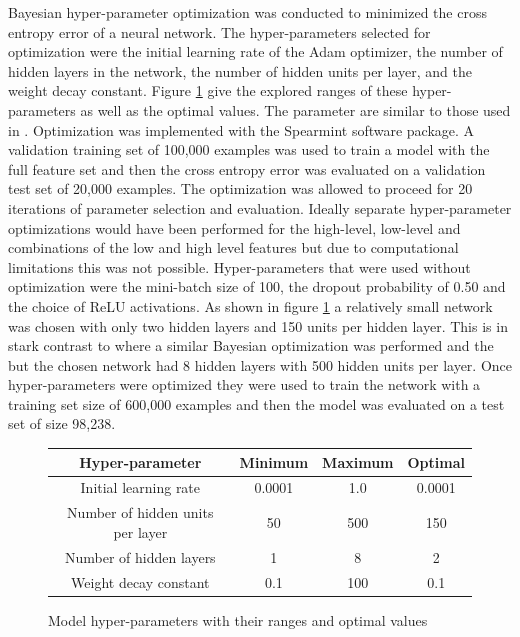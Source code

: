 \documentclass[12pt,letterpaper]{article}
\begin{document}
Bayesian hyper-parameter optimization was conducted to minimized the cross entropy error of a neural network.  The hyper-parameters selected for optimization were the initial learning rate of the Adam optimizer, the number of hidden layers in the network, the number of hidden units per layer, and the weight decay constant.  Figure \ref{fig:hypers} give the explored ranges of these hyper-parameters as well as the optimal values.  The parameter are similar to those used in \cite{Baldi:2014pta}. Optimization was implemented with the Spearmint software package.  A validation training set of 100,000 examples was used to train a model with the full feature set and then the cross entropy error was evaluated on a validation test set of 20,000 examples.  The optimization was allowed to proceed for 20 iterations of parameter selection and evaluation.  Ideally separate hyper-parameter optimizations would have been performed for the high-level, low-level and combinations of the low and high level features but due to computational limitations this was not possible. Hyper-parameters that were used without optimization were the mini-batch size of 100, the dropout probability of 0.50 and the choice of ReLU activations.  As shown in figure \ref{fig:hypers} a relatively small network was chosen with only two hidden layers and 150 units per hidden layer.  This is in stark contrast to \cite{Baldi:2014pta} where a similar Bayesian optimization was performed and the but the chosen network had 8 hidden layers with 500 hidden units per layer.  Once hyper-parameters were optimized they were used to train the network with a training set size of 600,000 examples and then the model was evaluated on a test set of size 98,238.

\begin{figure}
\begin{center}
\tiny
 \begin{tabular}{|c| c c c|} 
 \hline
 Hyper-parameter & Minimum & Maximum & Optimal\\ [0.5ex] 
 \hline\hline
 Initial learning rate & 0.0001 & 1.0 & 0.0001 \\[1ex] 
 \hline
 Number of hidden units per layer & 50 & 500 & 150 \\[1ex]
 \hline
 Number of hidden layers & 1 & 8 & 2 \\[1ex]
 \hline
 Weight decay constant & 0.1 & 100 & 0.1 \\[1ex]
 \hline

\end{tabular}
\caption{Model hyper-parameters with their ranges and optimal values}
\label{fig:hypers}
\end{center}
\end{figure}


{\small


}
\end{document}
